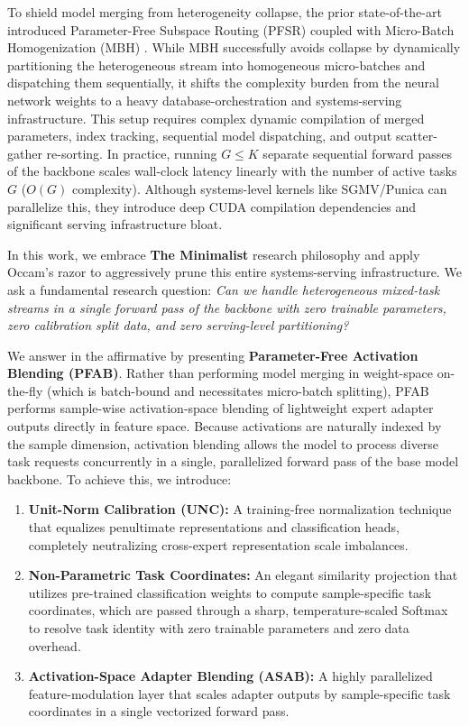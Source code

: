 To shield model merging from heterogeneity collapse, the prior state-of-the-art introduced Parameter-Free Subspace Routing (\textsc{PFSR}) coupled with Micro-Batch Homogenization (\textsc{MBH}) \cite{subspace2026}. While \textsc{MBH} successfully avoids collapse by dynamically partitioning the heterogeneous stream into homogeneous micro-batches and dispatching them sequentially, it shifts the complexity burden from the neural network weights to a heavy database-orchestration and systems-serving infrastructure. This setup requires complex dynamic compilation of merged parameters, index tracking, sequential model dispatching, and output scatter-gather re-sorting. In practice, running $G \le K$ separate sequential forward passes of the backbone scales wall-clock latency linearly with the number of active tasks $G$ ($O(G)$ complexity). Although systems-level kernels like \textsc{SGMV}/Punica \cite{sgmv2023, punica2023} can parallelize this, they introduce deep CUDA compilation dependencies and significant serving infrastructure bloat.

In this work, we embrace \textbf{The Minimalist} research philosophy and apply Occam's razor to aggressively prune this entire systems-serving infrastructure. We ask a fundamental research question: \emph{Can we handle heterogeneous mixed-task streams in a single forward pass of the backbone with zero trainable parameters, zero calibration split data, and zero serving-level partitioning?}

We answer in the affirmative by presenting \textbf{Parameter-Free Activation Blending (PFAB)}. Rather than performing model merging in weight-space on-the-fly (which is batch-bound and necessitates micro-batch splitting), \textsc{PFAB} performs sample-wise activation-space blending of lightweight expert adapter outputs directly in feature space. Because activations are naturally indexed by the sample dimension, activation blending allows the model to process diverse task requests concurrently in a single, parallelized forward pass of the base model backbone. To achieve this, we introduce:
\begin{enumerate}
  \item \textbf{Unit-Norm Calibration (UNC):} A training-free normalization technique that equalizes penultimate representations and classification heads, completely neutralizing cross-expert representation scale imbalances.
  \item \textbf{Non-Parametric Task Coordinates:} An elegant similarity projection that utilizes pre-trained classification weights to compute sample-specific task coordinates, which are passed through a sharp, temperature-scaled Softmax to resolve task identity with zero trainable parameters and zero data overhead.
  \item \textbf{Activation-Space Adapter Blending (ASAB):} A highly parallelized feature-modulation layer that scales adapter outputs by sample-specific task coordinates in a single vectorized forward pass.
\end{enumerate}

